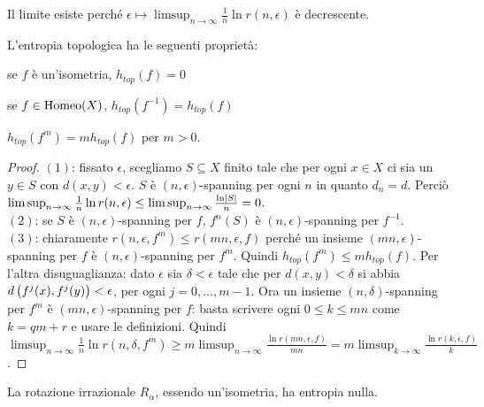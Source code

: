 Il limite esiste perché $\epsilon\mapsto\limsup_{n\to\infty}\frac{1}{n}\ln r(n,\epsilon)$ è decrescente.

\begin{prop}L'entropia topologica ha le seguenti proprietà:
\begin{lista}
\item se $f$ è un'isometria, $h_{top}(f)=0$
\item se $f\in\operatorname{Homeo}(X)$, $h_{top}(f^{-1})=h_{top}(f)$
\item $h_{top}(f^m)=mh_{top}(f)$ per $m>0$.
\end{lista}
\end{prop}

\begin{proof}$(1)$: fissato $\epsilon$, scegliamo $S\subseteq X$ finito tale che per ogni $x\in X$
ci sia un $y\in S$ con $d(x,y)<\epsilon$. $S$ è $(n,\epsilon)$-spanning per ogni $n$ in quanto $d_n=d$.
Perciò $\limsup_{n\to\infty}\frac{1}{n}\ln r(n,\epsilon)\le\limsup_{n\to\infty}\frac{\ln\left|S\right|}{n}=0$. \\
$(2)$: se $S$ è $(n,\epsilon)$-spanning per $f$, $f^n(S)$ è $(n,\epsilon)$-spanning per $f^{-1}$. \\
$(3)$: chiaramente $r(n,\epsilon,f^m)\le r(mn,\epsilon,f)$ perché un insieme $(mn,\epsilon)$-spanning per $f$
è $(n,\epsilon)$-spanning per $f^m$. Quindi $h_{top}(f^m)\le m h_{top}(f)$.
Per l'altra disuguaglianza: dato $\epsilon$ sia $\delta<\epsilon$ tale che per $d(x,y)<\delta$ si abbia $d\left(f^j(x),f^j(y)\right)<\epsilon$,
per ogni $j=0,\dots,m-1$. Ora un insieme $(n,\delta)$-spanning per $f^m$ è $(mn,\epsilon)$-spanning per $f$:
basta scrivere ogni $0\le k\le mn$ come $k=qm+r$ e usare le definizioni.
Quindi $\limsup_{n\to\infty}\frac{1}{n}\ln r(n,\delta,f^m)\ge m\limsup_{n\to\infty}\frac{\ln r(mn,\epsilon,f)}{mn}
=m\limsup_{k\to\infty}\frac{\ln r(k,\epsilon,f)}{k}$.
\end{proof}

\begin{esempio}La rotazione irrazionale $R_\alpha$, essendo un'isometria, ha entropia nulla.
\end{esempio}

